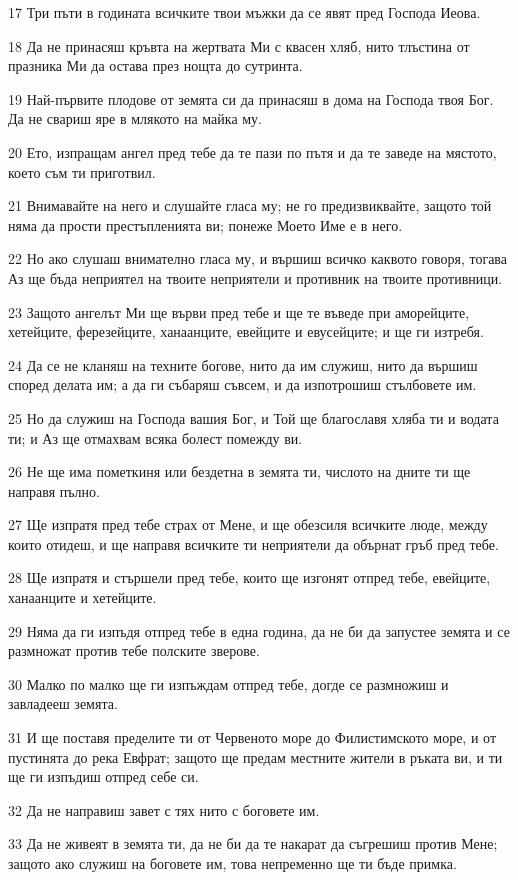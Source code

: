 \par 17 Три пъти в годината всичките твои мъжки да се явят пред Господа Иеова.
\par 18 Да не принасяш кръвта на жертвата Ми с квасен хляб, нито тлъстина от празника Ми да остава през нощта до сутринта.
\par 19 Най-първите плодове от земята си да принасяш в дома на Господа твоя Бог. Да не свариш яре в млякото на майка му.
\par 20 Ето, изпращам ангел пред тебе да те пази по пътя и да те заведе на мястото, което съм ти приготвил.
\par 21 Внимавайте на него и слушайте гласа му; не го предизвиквайте, защото той няма да прости престъпленията ви; понеже Моето Име е в него.
\par 22 Но ако слушаш внимателно гласа му, и вършиш всичко каквото говоря, тогава Аз ще бъда неприятел на твоите неприятели и противник на твоите противници.
\par 23 Защото ангелът Ми ще върви пред тебе и ще те въведе при аморейците, хетейците, ферезейците, ханаанците, евейците и евусейците; и ще ги изтребя.
\par 24 Да се не кланяш на техните богове, нито да им служиш, нито да вършиш според делата им; а да ги събаряш съвсем, и да изпотрошиш стълбовете им.
\par 25 Но да служиш на Господа вашия Бог, и Той ще благославя хляба ти и водата ти; и Аз ще отмахвам всяка болест помежду ви.
\par 26 Не ще има пометкиня или бездетна в земята ти, числото на дните ти ще направя пълно.
\par 27 Ще изпратя пред тебе страх от Мене, и ще обезсиля всичките люде, между които отидеш, и ще направя всичките ти неприятели да обърнат гръб пред тебе.
\par 28 Ще изпратя и стършели пред тебе, които ще изгонят отпред тебе, евейците, ханаанците и хетейците.
\par 29 Няма да ги изпъдя отпред тебе в една година, да не би да запустее земята и се размножат против тебе полските зверове.
\par 30 Малко по малко ще ги изпъждам отпред тебе, догде се размножиш и завладееш земята.
\par 31 И ще поставя пределите ти от Червеното море до Филистимското море, и от пустинята до река Евфрат; защото ще предам местните жители в ръката ви, и ти ще ги изпъдиш отпред себе си.
\par 32 Да не направиш завет с тях нито с боговете им.
\par 33 Да не живеят в земята ти, да не би да те накарат да съгрешиш против Мене; защото ако служиш на боговете им, това непременно ще ти бъде примка.

